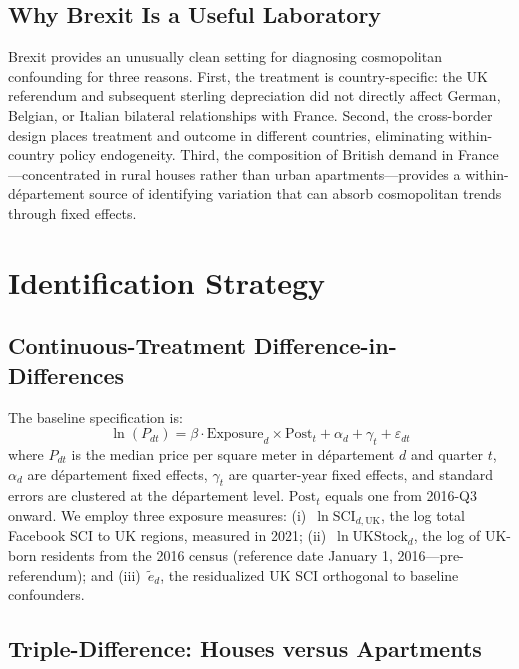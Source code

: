 \documentclass[12pt]{article}
\begin{document}
\subsection{Why Brexit Is a Useful Laboratory}

Brexit provides an unusually clean setting for diagnosing cosmopolitan confounding for three reasons. First, the treatment is country-specific: the UK referendum and subsequent sterling depreciation did not directly affect German, Belgian, or Italian bilateral relationships with France. Second, the cross-border design places treatment and outcome in different countries, eliminating within-country policy endogeneity. Third, the composition of British demand in France---concentrated in rural houses rather than urban apartments---provides a within-d\'epartement source of identifying variation that can absorb cosmopolitan trends through fixed effects.


\section{Identification Strategy}\label{sec:identification}

\subsection{Continuous-Treatment Difference-in-Differences}

The baseline specification is:
\begin{equation}\label{eq:baseline}
\ln(P_{dt}) = \beta \cdot \text{Exposure}_d \times \text{Post}_t + \alpha_d + \gamma_t + \varepsilon_{dt}
\end{equation}
where $P_{dt}$ is the median price per square meter in d\'epartement $d$ and quarter $t$, $\alpha_d$ are d\'epartement fixed effects, $\gamma_t$ are quarter-year fixed effects, and standard errors are clustered at the d\'epartement level. $\text{Post}_t$ equals one from 2016-Q3 onward. We employ three exposure measures: (i)~$\ln\text{SCI}_{d,\text{UK}}$, the log total Facebook SCI to UK regions, measured in 2021; (ii)~$\ln\text{UKStock}_d$, the log of UK-born residents from the 2016 census (reference date January 1, 2016---pre-referendum); and (iii)~$\tilde{e}_d$, the residualized UK SCI orthogonal to baseline confounders.

\subsection{Triple-Difference: Houses versus Apartments}\label{subsec:triple}
\end{document}
